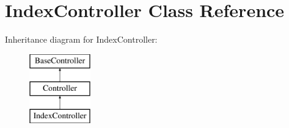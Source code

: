 \hypertarget{class_responsive_1_1_http_1_1_controllers_1_1_index_controller}{}\section{Index\+Controller Class Reference}
\label{class_responsive_1_1_http_1_1_controllers_1_1_index_controller}
Inheritance diagram for Index\+Controller\+:\begin{figure}[H]
\begin{center}
\leavevmode
\includegraphics[height=3.000000cm]{class_responsive_1_1_http_1_1_controllers_1_1_index_controller}
\end{center}
\end{figure}
